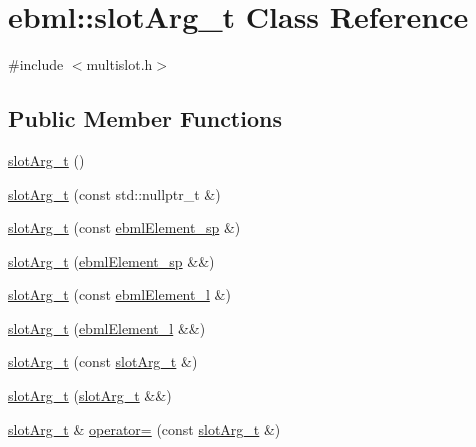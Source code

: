 \hypertarget{classebml_1_1slotArg__t}{}\section{ebml\+:\+:slot\+Arg\+\_\+t Class Reference}
\label{classebml_1_1slotArg__t}


{\ttfamily \#include $<$multislot.\+h$>$}

\subsection*{Public Member Functions}
\begin{DoxyCompactItemize}
\item 
\mbox{\hyperlink{classebml_1_1slotArg__t_a59249e5f6cf0f643d4ebea7bc5f01e53}{slot\+Arg\+\_\+t}} ()
\item 
\mbox{\hyperlink{classebml_1_1slotArg__t_a591c64b34980557575356624d41f1dfa}{slot\+Arg\+\_\+t}} (const std\+::nullptr\+\_\+t \&)
\item 
\mbox{\hyperlink{classebml_1_1slotArg__t_a6d0298f32f02bb42259aecaf109c06f1}{slot\+Arg\+\_\+t}} (const \mbox{\hyperlink{namespaceebml_adad533b7705a16bb360fe56380c5e7be}{ebml\+Element\+\_\+sp}} \&)
\item 
\mbox{\hyperlink{classebml_1_1slotArg__t_a51d5c0e7d0fa1c08aa838b2dcf0000e0}{slot\+Arg\+\_\+t}} (\mbox{\hyperlink{namespaceebml_adad533b7705a16bb360fe56380c5e7be}{ebml\+Element\+\_\+sp}} \&\&)
\item 
\mbox{\hyperlink{classebml_1_1slotArg__t_a96b4367cbf3107c56fc9bcb5ef72a203}{slot\+Arg\+\_\+t}} (const \mbox{\hyperlink{namespaceebml_a1ddadd26791f273d851882653b9caf70}{ebml\+Element\+\_\+l}} \&)
\item 
\mbox{\hyperlink{classebml_1_1slotArg__t_a77b50a5a4f95f700be0b7aacb7117a79}{slot\+Arg\+\_\+t}} (\mbox{\hyperlink{namespaceebml_a1ddadd26791f273d851882653b9caf70}{ebml\+Element\+\_\+l}} \&\&)
\item 
\mbox{\hyperlink{classebml_1_1slotArg__t_a41a7e21e1780fc1965d1c9ec1cf50c35}{slot\+Arg\+\_\+t}} (const \mbox{\hyperlink{classebml_1_1slotArg__t}{slot\+Arg\+\_\+t}} \&)
\item 
\mbox{\hyperlink{classebml_1_1slotArg__t_a557c93afda9fcf328c28ecfc3877790e}{slot\+Arg\+\_\+t}} (\mbox{\hyperlink{classebml_1_1slotArg__t}{slot\+Arg\+\_\+t}} \&\&)
\item 
\mbox{\hyperlink{classebml_1_1slotArg__t}{slot\+Arg\+\_\+t}} \& \mbox{\hyperlink{classebml_1_1slotArg__t_a1a584ff973b655fad2bc8cc4dadbe859}{operator=}} (const \mbox{\hyperlink{classebml_1_1slotArg__t}{slot\+Arg\+\_\+t}} \&)

\end{DoxyCompactItemize}
